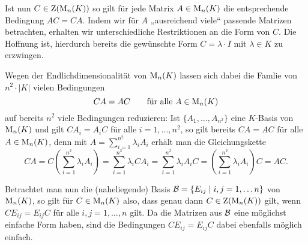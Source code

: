\begin{remark}
  Ist nun $C \in \operatorname{Z}( \operatorname{M}_{n}(K) )$ so gilt für jede Matrix $A \in \operatorname{M}_{n}(K)$ die entsprechende Bedingung $A C = C A$.
  Indem wir für $A$ „ausreichend viele“ passende Matrizen betrachten, erhalten wir unterschiedliche Restriktionen an die Form von $C$.
  Die Hoffnung ist, hierdurch bereits die gewünschte Form $C = \lambda \cdot I$ mit $\lambda \in K$ zu erzwingen.
  
  Wegen der Endlichdimensionalität von $\operatorname{M}_{n}(K)$ lassen sich dabei die Famlie von $n^2 \cdot |K|$ vielen Bedingungen
  \[
    CA = AC
    \qquad
    \text{für alle $A \in \operatorname{M}_{n}(K)$}
  \]
  auf bereits $n^2$ viele Bedingungen reduzieren:
  Ist $\{ A_1, \dotsc, A_{n^2} \}$ eine $K$-Basis von $\operatorname{M}_{n}(K)$ und gilt $C A_i = A_i C$ für alle $i = 1, \dotsc, n^2$, so gilt bereits $C A = A C$ für alle $A \in \operatorname{M}_{n}(K)$, denn mit $A = \sum_{i=1}^{n^2} \lambda_i A_i$ erhält man die Gleichungskette
  \[
      C A
    = C \left( \sum_{i=1}^{n^2} \lambda_i A_i \right)
    = \sum_{i=1}^{n^2} \lambda_i C A_i
    = \sum_{i=1}^{n^2} \lambda_i A_i C
    = \left( \sum_{i=1}^{n^2} \lambda_i A_i \right) C
    = A C.
  \]
  
  Betrachtet man nun die (naheliegende) Basis $\mathcal{B} = \{ E_{ij} \mid i, j = 1, \dotsc n \}$ von $\operatorname{M}_{n}(K)$, so gilt für $C \in \operatorname{M}_{n}(K)$ also, dass genau dann $C \in \operatorname{Z}( \operatorname{M}_{n}(K) )$ gilt, wenn $C E_{ij} = E_{ij} C$ für alle $i, j = 1, \dotsc, n$ gilt.
  Da die Matrizen aus $\mathcal{B}$ eine möglichst einfache Form haben, sind die Bedingungen $C E_{ij} = E_{ij} C$ dabei ebenfalls möglich einfach.
\end{remark}

